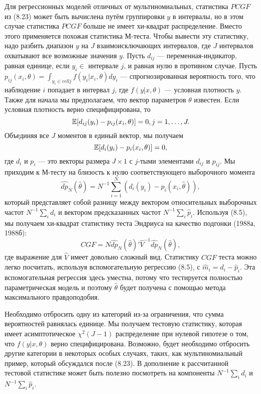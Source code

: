 Для регрессионных моделей отличных от мультиномиальных, статистика $PCGF$ из (8.23) может быть вычислена путём группировки $y$ в интервалы, но в этом случае статистика $PCGF$ больше не имеет хи-квадрат распределение. Вместо этого применяется похожая статистика М-теста. Чтобы вывести эту статистику, надо разбить диапазон $y$ на $J$ взаимоисключающих интервалов, где $J$ интервалов охватывают все возможные значения $y$. Пусть $d_{ij}$ --- переменная-индикатор, равная единице, если $y_i \in$ интервале $j$, и равная нулю в противном случае. Пусть $p_{ij}(x_i, \theta) = \int_{y_i \in cell j} f(y_i| x_i, \theta)dy_i$ --- спрогнозированная вероятность того, что наблюдение $i$ попадает в интервал $j$, где $f(y|x, \theta)$ --- условная плотность $y$. Также для начала мы предполагаем, что вектор параметров $\theta$ известен. Если условная плотность верно специфицирована, то
\begin{equation}
\mathbb{E}[d_{ij}(y_i) - p_{ij}(x_i, \theta)] = 0, j = 1, \dots, J.
\end{equation}
Объединяя все $J$ моментов в единый вектор, мы получаем
\begin{equation}
\mathbb{E}[d_i(y_i) - p_i(x_i, \theta)] = 0,
\end{equation}
где $d_i$ и $p_i$ --- это векторы размера $J \times 1$ с $j$-тыми элементами $d_{ij}$ и $p_{ij}$. Мы приходим к  М-тесту на близость к нулю соответствующего выборочного момента
\begin{equation}
\widehat{dp}_N(\hat{\theta}) = N^{-1}\sum_{i=1}^N (d_i(y_i) - p_i(x_i, \hat{\theta})),
\end{equation}
который представляет собой разницу между вектором относительных выборочных частот $N^{-1}\sum_i d_i$ и вектором предсказанных частот $N^{-1}\sum_i \hat{p}_i$. Используя (8.5), мы получаем хи-квадрат статистику теста Эндриуса на качество подгонки (1988а, 1988б):
\begin{equation}
CGF = N\widehat{dp}_N(\hat{\theta})'\hat{V}^{-1}\widehat{dp}_N(\hat{\theta}), 
\end{equation}
где выражение для $\hat{V}$ имеет довольно сложный вид. Статистику $CGF$ теста можно легко посчитать, используя вспомогательную регрессию (8.5), с $\hat{m}_i = d_i - \hat{p}_i$. Эта вспомогательная регрессия здесь уместна, потому что тестируется полностью параметрическая модель и поэтому $\hat{\theta}$ будет получена с помощью метода максимального правдоподобия.

Необходимо отбросить одну из категорий из-за  ограничения, что сумма вероятностей равнялась единице. Мы получаем тестовую статистику, которая имеет асимптотическое $\chi^2(J - 1)$ распределение при нулевой гипотезе о том, что $f(y|x, \theta)$ верно специфицирована. Возможно, будет необходимо отбросить другие категории в некоторых особых случаях, таких, как мультиномиальный пример, который обсуждался после (8.23). В дополнение к рассчитанной тестовой статистике может быть полезно посмотреть на компоненты $N^{-1}\sum_i d_i$ и $N^{-1}\sum_i \hat{p}_i$.

